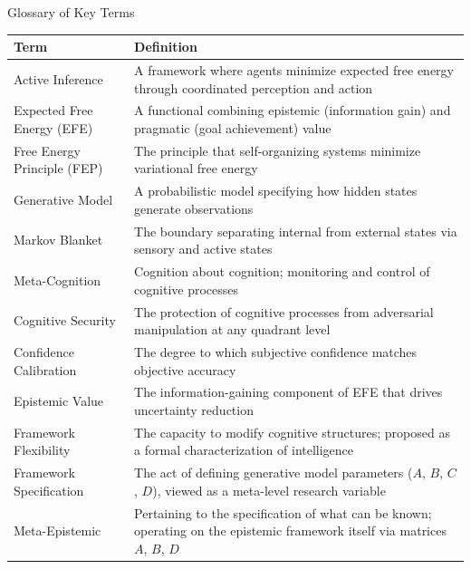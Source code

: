 \documentclass[
  ignorenonframetext,
]{beamer}
\newcounter{none} %
\begin{document}
\begin{frame}{Glossary of Key Terms}
\protect{}\label{glossary-of-key-terms}
{\def\LTcaptype{none} %
\begin{longtable}[]{@{}
  >{\raggedright\arraybackslash}p{}
  >{\raggedright\arraybackslash}p{}@{}}
\toprule\noalign{}
\begin{minipage}[b]{\linewidth}\raggedright
Term
\end{minipage} & \begin{minipage}[b]{\linewidth}\raggedright
Definition
\end{minipage} \\
\midrule\noalign{}
\endhead
Active Inference & A framework where agents minimize expected free
energy through coordinated perception and action \\
Expected Free Energy (EFE) & A functional combining epistemic
(information gain) and pragmatic (goal achievement) value \\
Free Energy Principle (FEP) & The principle that self-organizing systems
minimize variational free energy \\
Generative Model & A probabilistic model specifying how hidden states
generate observations \\
Markov Blanket & The boundary separating internal from external states
via sensory and active states \\
Meta-Cognition & Cognition about cognition; monitoring and control of
cognitive processes \\
Cognitive Security & The protection of cognitive processes from
adversarial manipulation at any quadrant level \\
Confidence Calibration & The degree to which subjective confidence
matches objective accuracy \\
Epistemic Value & The information-gaining component of EFE that drives
uncertainty reduction \\
Framework Flexibility & The capacity to modify cognitive structures;
proposed as a formal characterization of intelligence \\
Framework Specification & The act of defining generative model
parameters (\(A\), \(B\), \(C\), \(D\)), viewed as a meta-level research
variable \\
Meta-Epistemic & Pertaining to the specification of what can be known;
operating on the epistemic framework itself via matrices \(A\), \(B\),
\(D\) \\

\end{longtable}}
\end{frame}
\end{document}
